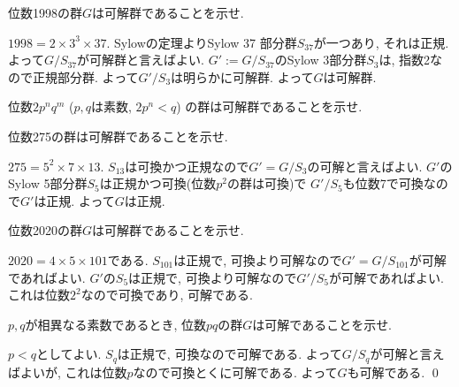 \begin{egprob}
位数1998の群$G$は可解群であることを示せ.
\end{egprob}
\begin{egans}
$1998=2 \times 3^3 \times 37$. Sylowの定理よりSylow 37 部分群$S_{37}$が一つあり, それは正規. よって$G/S_{37}$が可解群と言えばよい. $G' := G/S_{37}$のSylow $3$部分群$S_{3}$は, 指数2なので正規部分群. よって$G'/S_3$は明らかに可解群. よって$G$は可解群.
\end{egans}

\begin{prac}
位数$2p^nq^m$ ($p,q$は素数, $2p^n < q$) の群は可解群であることを示せ.
\end{prac}

\begin{egprob}
位数275の群は可解群であることを示せ.
\end{egprob}
\begin{egans}
$275 = 5^2 \times 7 \times 13$. $S_{13}$は可換かつ正規なので$G' = G/S_3$の可解と言えばよい. $G'$のSylow 5部分群$S_{5}$は正規かつ可換(位数$p^2$の群は可換)で $G'/S_{5}$も位数7で可換なので$G'$は正規. よって$G$は正規.
\end{egans}

\begin{egprob}
位数2020の群$G$は可解群であることを示せ.
\end{egprob}
\begin{egans}
$2020 = 4\times 5\times 101$である. $S_{101}$は正規で, 可換より可解なので$G' = G/S_{101}$が可解であればよい. $G'$の$S_{5}$は正規で, 可換より可解なので$G'/S_{5}$が可解であればよい. これは位数$2^2$なので可換であり, 可解である.
\end{egans}

\begin{egprob}
$p,q$が相異なる素数であるとき, 位数$pq$の群$G$は可解であることを示せ.
\end{egprob}
\begin{egans}
$p<q$としてよい. $S_q$は正規で, 可換なので可解である. よって$G/S_{q}$が可解と言えばよいが, これは位数$p$なので可換とくに可解である. よって$G$も可解である. \qed
\end{egans}

